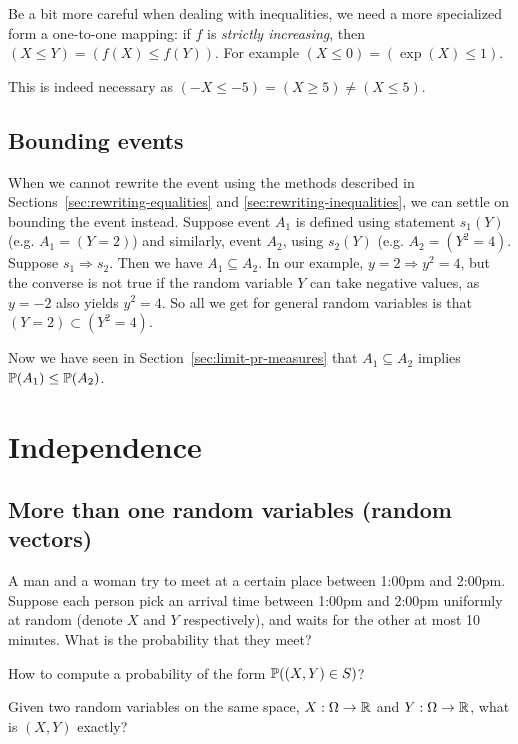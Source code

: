 \documentclass{article}
\begin{document}
Be a bit more careful when dealing with inequalities, we need a more specialized form a one-to-one mapping: if $f$ is \emph{strictly increasing}, then $(X \le Y) = (f(X) \le f(Y))$. For example $(X \le 0) = (\exp(X) \le 1)$.

This is indeed necessary as $(-X \le -5) = (X \ge 5) \neq (X \le 5)$.


\subsection{Bounding events}

When we cannot rewrite the event using the methods described in Sections~\ref{sec:rewriting-equalities} and \ref{sec:rewriting-inequalities}, we can settle on bounding the event instead. Suppose event $A_1$ is defined using statement $s_1(Y)$ (e.g. $A_1 = (Y = 2)$) and similarly, event $A_2$, using $s_2(Y)$ (e.g. $A_2 = (Y^2 = 4)$. Suppose $s_1 \Longrightarrow s_2$. Then we have $A_1 \subseteq A_2$. In our example, $y = 2 \Longrightarrow y^2 = 4$, but the converse is not true if the random variable $Y$ can take negative values, as $y = -2$ also yields $y^2 = 4$. So all we get for general random variables is that $(Y = 2) \subset (Y^2 = 4)$.

Now we have seen in Section~\ref{sec:limit-pr-measures} that $A_1 \subseteq A_2$ implies $\P(A_1) \le \P(A_2)$.


\section{Independence}

\subsection{More than one random variables (random vectors)}\label{sec:random-vectors}

 A man and a woman try to meet at a certain place between 1:00pm and 2:00pm.  Suppose each person pick an arrival time between 1:00pm and 2:00pm uniformly at random (denote $X$ and $Y$ respectively), and waits for the other at most 10 minutes. What is the probability that they meet?

 How to compute a probability of the form $\P((X, Y) \in S)$?

 Given two random variables on the same space, $X: \Omega \to \R$ and $Y : \Omega \to \R$, what is $(X, Y)$ exactly?
\end{document}
